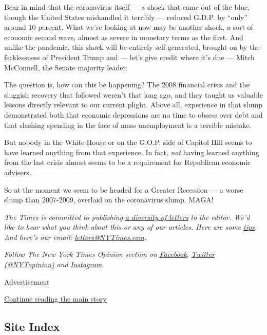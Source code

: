 Bear in mind that the coronavirus itself --- a shock that came out of
the blue, though the United States mishandled it terribly --- reduced
G.D.P. by ``only'' around 10 percent. What we're looking at now may be
another shock, a sort of economic second wave, almost as severe in
monetary terms as the first. And unlike the pandemic, this shock will be
entirely self-generated, brought on by the fecklessness of President
Trump and --- let's give credit where it's due --- Mitch McConnell, the
Senate majority leader.

The question is, how can this be happening? The 2008 financial crisis
and the sluggish recovery that followed weren't that long ago, and they
taught us valuable lessons directly relevant to our current plight.
Above all, experience in that slump demonstrated both that economic
depressions are no time to obsess over debt and that slashing spending
in the face of mass unemployment is a terrible mistake.

But nobody in the White House or on the G.O.P. side of Capitol Hill
seems to have learned anything from that experience. In fact, \emph{not}
having learned anything from the last crisis almost seems to be a
requirement for Republican economic advisers.

So at the moment we seem to be headed for a Greater Recession --- a
worse slump than 2007-2009, overlaid on the coronavirus slump. MAGA!

\emph{The Times is committed to publishing}
\href{https://www.nytimes3xbfgragh.onion/2019/01/31/opinion/letters/letters-to-editor-new-york-times-women.html}{\emph{a
diversity of letters}} \emph{to the editor. We'd like to hear what you
think about this or any of our articles. Here are some}
\href{https://help.nytimes3xbfgragh.onion/hc/en-us/articles/115014925288-How-to-submit-a-letter-to-the-editor}{\emph{tips}}\emph{.
And here's our email:}
\href{mailto:letters@NYTimes.com}{\emph{letters@NYTimes.com}}\emph{.}

\emph{Follow The New York Times Opinion section on}
\href{https://www.facebookcorewwwi.onion/nytopinion}{\emph{Facebook}}\emph{,}
\href{http://twitter.com/NYTOpinion}{\emph{Twitter (@NYTopinion)}}
\emph{and}
\href{https://www.instagram.com/nytopinion/}{\emph{Instagram}}\emph{.}

Advertisement

\protect\hyperlink{after-bottom}{Continue reading the main story}

\hypertarget{site-index}{%
\subsection{Site Index}\label{site-index}}

